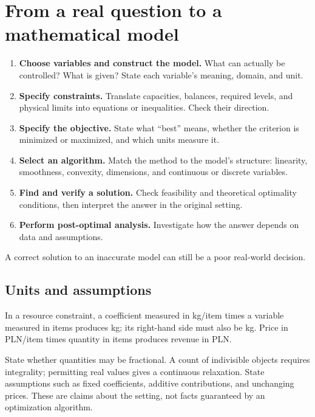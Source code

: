 \documentclass[11pt,a4paper]{article}
\begin{document}
\section{From a real question to a mathematical model}\label{sec:workflow}
\begin{enumerate}[leftmargin=1.8em]
  \item \textbf{Choose variables and construct the model.} What can actually be
        controlled? What is given? State each variable's meaning, domain, and unit.
  \item \textbf{Specify constraints.} Translate capacities, balances, required
        levels, and physical limits into equations or inequalities. Check their direction.
  \item \textbf{Specify the objective.} State what ``best'' means, whether the
        criterion is minimized or maximized, and which units measure it.
  \item \textbf{Select an algorithm.} Match the method to the model's structure:
        linearity, smoothness, convexity, dimensions, and continuous or discrete variables.
  \item \textbf{Find and verify a solution.} Check feasibility and theoretical
        optimality conditions, then interpret the answer in the original setting.
  \item \textbf{Perform post-optimal analysis.} Investigate how the answer depends
        on data and assumptions.
\end{enumerate} A correct solution to an inaccurate
model can still be a poor real-world decision.

\subsection{Units and assumptions}
In a resource constraint, a coefficient measured in kg/item times a variable
measured in items produces kg; its right-hand side must also be kg. Price in
PLN/item times quantity in items produces revenue in PLN.

State whether quantities may be fractional. A count of indivisible objects
requires integrality; permitting real values gives a continuous relaxation.
State assumptions such as fixed coefficients, additive contributions, and
unchanging prices. These are claims about the setting, not facts guaranteed by
an optimization algorithm.
\end{document}
